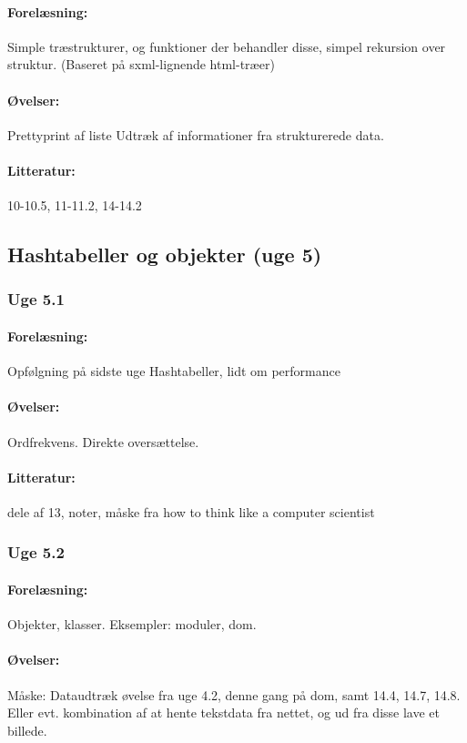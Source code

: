 \documentclass[12pt]{article}
\begin{document}
\paragraph{Forelæsning:} 
Simple træstrukturer, og funktioner der behandler disse, simpel rekursion over struktur. (Baseret på sxml-lignende html-træer)
\paragraph{Øvelser:}
Prettyprint af liste
Udtræk af informationer fra strukturerede data.
\paragraph{Litteratur:} 10-10.5, 11-11.2, 14-14.2

\subsection{Hashtabeller og objekter (uge 5)}
\subsubsection{Uge 5.1}
\paragraph{Forelæsning:} 
Opfølgning på sidste uge
Hashtabeller, lidt om performance
\paragraph{Øvelser:}
Ordfrekvens.
Direkte oversættelse.
\paragraph{Litteratur:} dele af 13, noter, måske fra how to think like a computer scientist

\subsubsection{Uge 5.2}
\paragraph{Forelæsning:} 
Objekter, klasser.
Eksempler: moduler, dom.
\paragraph{Øvelser:}
Måske: Dataudtræk øvelse fra uge 4.2, denne gang på dom, samt  14.4, 14.7, 14.8. Eller evt. kombination af at hente tekstdata fra nettet, og ud fra disse lave et billede.
\end{document}
